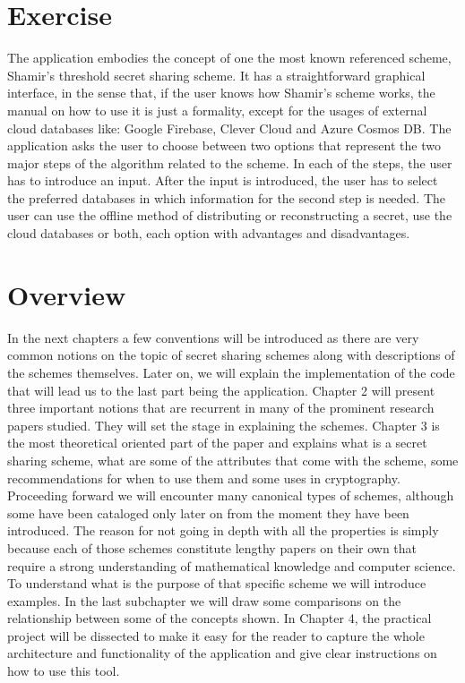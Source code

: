 \documentclass[12pt, a4paper, oneside]{book}
\begin{document}
    \section{Exercise} 
    The application embodies the concept of one the most known referenced scheme, Shamir's threshold secret sharing scheme. It has a straightforward graphical interface, in the sense that, if the user knows how Shamir's scheme works, the manual on how to use it is just a formality, except for the usages of external cloud databases like: Google Firebase, Clever Cloud and Azure Cosmos DB. The application asks the user to choose between two options that represent the two major steps of the algorithm related to the scheme. In each of the steps, the user has to introduce an input. After the input is introduced, the user has to select the preferred databases in which information for the second step is needed. The user can use the offline method of distributing or reconstructing a secret, use the cloud databases or both, each option with advantages and disadvantages.
    \\
    \section{Overview} In the next chapters a few conventions will be introduced as there are very common notions on the topic of secret sharing schemes along with descriptions of the schemes themselves. Later on, we will explain the implementation of the code that will lead us to the last part being the application.
    Chapter 2 will present three important notions that are recurrent in many of the prominent research papers studied. They will set the stage in explaining the schemes. Chapter 3 is the most theoretical oriented part of the paper and explains what is a secret sharing scheme, what are some of the attributes that come with the scheme, some recommendations for when to use them and some uses in cryptography. Proceeding forward we will encounter many canonical types of schemes, although some have been cataloged only later on from the moment they have been introduced. The reason for not going in depth with all the properties is simply because each of those schemes constitute lengthy papers on their own that require a strong understanding of mathematical knowledge and computer science. To understand what is the purpose of that specific scheme we will introduce examples. In the last subchapter we will draw some comparisons on the relationship between some of the concepts shown. In Chapter 4, the practical project will be dissected to make it easy for the reader to capture the whole architecture and functionality of the application and give clear instructions on how to use this tool.
    
\end{document}

